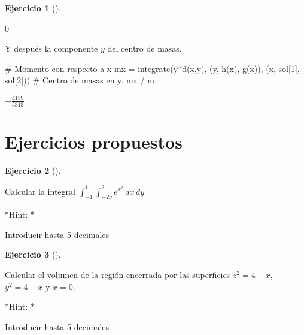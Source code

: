 \documentclass[
  a4paper,
]{scrreport}
\newenvironment{Shaded}{\begin{snugshade}}{\end{snugshade}}
\newcommand{\CommentTok}[1]{\textcolor[rgb]{0.37,0.37,0.37}{#1}}
\newcommand{\FloatTok}[1]{\textcolor[rgb]{0.68,0.00,0.00}{#1}}
\newcommand{\FunctionTok}[1]{\textcolor[rgb]{0.28,0.35,0.67}{#1}}
\newcommand{\NormalTok}[1]{\textcolor[rgb]{0.00,0.23,0.31}{#1}}
\newcommand{\OperatorTok}[1]{\textcolor[rgb]{0.37,0.37,0.37}{#1}}
\theoremstyle{definition}
\newtheorem{exercise}{Ejercicio}[chapter]
\theoremstyle{remark}
\begin{document}
\begin{exercise}[]
\begin{enumerate}
\begin{tcolorbox}
  $0$

  Y después la componente \(y\) del centro de masas.

\begin{Shaded}
\begin{Highlighting}[]
\CommentTok{\# Momento con respecto a x}
\NormalTok{mx }\OperatorTok{=} \FunctionTok{integrate}\NormalTok{(}\FunctionTok{y*d}\NormalTok{(x,y), (y, }\FunctionTok{h}\NormalTok{(x), }\FunctionTok{g}\NormalTok{(x)), (x, sol[}\FloatTok{1}\NormalTok{], sol[}\FloatTok{2}\NormalTok{]))}
\CommentTok{\# Centro de masas en y.}
\NormalTok{mx }\OperatorTok{/}\NormalTok{ m}
\end{Highlighting}
\end{Shaded}

  $- \frac{4159}{5313}$

  \end{tcolorbox}
\end{enumerate}

\end{exercise}

\hypertarget{ejercicios-propuestos-8}{%
\section{Ejercicios propuestos}\label{ejercicios-propuestos-8}}

\begin{exercise}[]\protect\hypertarget{exr-integrales-funciones-varias-variables-propuesto-1}{}\label{exr-integrales-funciones-varias-variables-propuesto-1}

Calcular la integral \(\int_{-1}^1\int_{-2y}^{2} e^{x^2}\,dx\,dy\)

\vspace{18pt}*Hint: *

Introducir hasta 5 decimales

\end{exercise}

\begin{exercise}[]\protect\hypertarget{exr-integrales-funciones-varias-variables-propuesto-2}{}\label{exr-integrales-funciones-varias-variables-propuesto-2}

Calcular el volumen de la región encerrada por las superficies
\(z^2=4-x\), \(y^2=4-x\) y \(x=0\).

\vspace{18pt}*Hint: *

Introducir hasta 5 decimales

\end{exercise}
\end{document}
